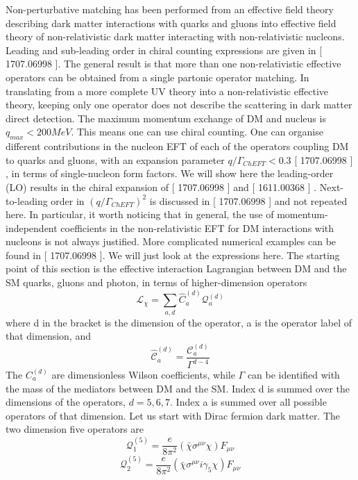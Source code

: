 \documentclass[12pt]{article}
\begin{document}
 Non-perturbative matching has been performed from an effective field theory describing dark matter interactions with quarks and gluons into effective field theory of non-relativistic dark matter interacting with non-relativistic nucleons. 
 Leading and sub-leading order in chiral counting expressions are given in [ 1707.06998 ]. 
 The general result is that more than one non-relativistic effective operators can be obtained from a single partonic operator matching. 
 In translating from a more complete UV theory into a non-relativistic effective theory, keeping only one operator does not describe the scattering in dark matter direct detection. 
 The maximum momentum exchange of DM and nucleus is $q_{max}< 200 MeV$. 
 This means one can use chiral counting.  One can organise different contributions in the nucleon EFT of each of the operators coupling DM to quarks and gluons, with an expansion parameter $q/\Gamma_{ChEFT}< 0.3$ [ 1707.06998 ] , in terms of single-nucleon form factors. 
 We will show here the leading-order (LO) results in the chiral expansion of [ 1707.06998 ] and [ 1611.00368 ] . Next-to-leading order in $(q/\Gamma_{ChEFT})^2$ is discussed in [ 1707.06998 ] and not repeated here. 
 In particular, it worth noticing that in general, the use of momentum-independent coefficients in the non-relativistic EFT for DM interactions with nucleons is not always justified. 
 More complicated numerical examples can be found in [ 1707.06998 ]. We will just look at the expressions here. 
 The starting point of this section is the effective interaction Lagrangian between DM and the SM quarks, gluons and photon, in terms of higher-dimension operators
 \begin{equation}\label{lag}
 \mathcal L_\chi = \sum_{a,d} \hat C_a^{(d)} \mathcal Q_a^{(d)}
\end{equation} 
 where d in the bracket is the dimension of the operator, a is the operator label of that dimension, and 
 $$
 \mathcal{\hat C}_a^{(d)} = \frac{\mathcal C_a^{(d)}}{\Gamma^{d-4}}
 $$
  The $C_a^{(d)}$ are dimensionless Wilson coefficients, while $\Gamma$ can be identified with the mass of the mediators between DM and the SM. 
 Index d is summed over the dimensions of the operators, $d=5,6,7$. 
 Index a is summed over all possible operators of that dimension. 
Let us start with Dirac fermion dark matter. The two dimension five operators are 
 $$
 \mathcal Q_1^{(5)} = \frac {e}{8\pi^2} (\bar \chi \sigma^{\mu \nu} \chi ) F_{\mu \nu} 
 $$
 $$
  \mathcal Q_2^{(5)} = \frac {e}{8\pi^2} (\bar \chi \sigma^{\mu \nu} i \gamma_5 \chi ) F_{\mu \nu} 
$$
\end{document}
